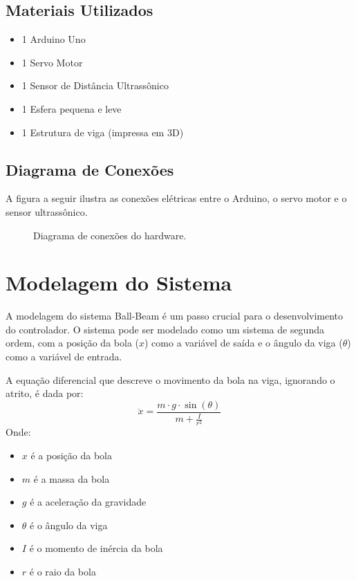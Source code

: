 \documentclass[a4paper, 11pt]{article}
\begin{document}
\subsection{Materiais Utilizados}
\begin{itemize}
    \item 1 Arduino Uno
    \item 1 Servo Motor
    \item 1 Sensor de Distância Ultrassônico
    \item 1 Esfera pequena e leve
    \item 1 Estrutura de viga (impressa em 3D)
\end{itemize}

\subsection{Diagrama de Conexões}
A figura a seguir ilustra as conexões elétricas entre o Arduino, o servo motor e o sensor ultrassônico.
\begin{figure}[h!]
    \centering
    \caption{Diagrama de conexões do hardware.}
    \label{fig:conexoes}
\end{figure}

\section{Modelagem do Sistema}
A modelagem do sistema Ball-Beam é um passo crucial para o desenvolvimento do controlador. O sistema pode ser modelado como um sistema de segunda ordem, com a posição da bola ($x$) como a variável de saída e o ângulo da viga ($\theta$) como a variável de entrada.

A equação diferencial que descreve o movimento da bola na viga, ignorando o atrito, é dada por:
$$
\ddot{x} = \frac{m \cdot g \cdot \sin(\theta)}{m + \frac{I}{r^2}}
$$
Onde:
\begin{itemize}
    \item $x$ é a posição da bola
    \item $m$ é a massa da bola
    \item $g$ é a aceleração da gravidade
    \item $\theta$ é o ângulo da viga
    \item $I$ é o momento de inércia da bola
    \item $r$ é o raio da bola
\end{itemize}
\end{document}
